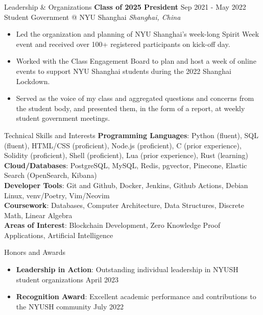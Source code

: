 \documentclass{cv} %
\begin{document}
\begin{rSection}{Leadership \& Organizations}
	\textbf{Class of 2025 President} \hfill Sep 2021 - May 2022 \\
	Student Government @ NYU Shanghai \hfill \textit{Shanghai, China}
	\begin{itemize}
		\item Led the organization and planning of NYU Shanghai’s week-long Spirit Week event and received over 100+ registered participants on kick-off day.
		\item Worked with the Class Engagement Board to plan and host a week of online events to support NYU Shanghai students during the 2022 Shanghai Lockdown.
		\item Served as the voice of my class and aggregated questions and concerns from the student body, and presented them, in the form of a report, at weekly student government meetings.
	\end{itemize}

\end{rSection}


\begin{rSection}{Technical Skills and Interests}
	\textbf{Programming Languages}{: Python (fluent), SQL (fluent), HTML/CSS (proficient), Node.js (proficient), C (prior experience), Solidity (proficient), Shell  (proficient), Lua (prior experience), Rust (learning)} \\
	\textbf{Cloud/Databases}{: PostgreSQL, MySQL, Redis, pgvector, Pinecone, Elastic Search (OpenSearch, Kibana)} \\
	\textbf{Developer Tools}{: Git and Github, Docker, Jenkins, Github Actions, Debian Linux, venv/Poetry, Vim/Neovim} \\
	\textbf{Coursework}{: Databases, Computer Architecture, Data Structures, Discrete Math, Linear Algebra} \\
	\textbf{Areas of Interest}{: Blockchain Development, Zero Knowledge Proof Applications, Artificial Intelligence}
\end{rSection}

\begin{rSection}{Honors and Awards}
	\begin{itemize}
		\item \textbf{Leadership in Action}{: Outstanding individual leadership in NYUSH student organizations} \hfill April 2023
		\item \textbf{Recognition Award}{: Excellent academic performance and contributions to the NYUSH community} \hfill July 2022
	\end{itemize}
\end{rSection}
\end{document}
